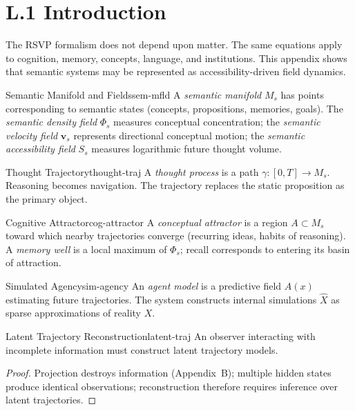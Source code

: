
\section*{L.1 Introduction}

The RSVP formalism does not depend upon matter. The same equations apply
to cognition, memory, concepts, language, and institutions. This appendix
shows that semantic systems may be represented as accessibility-driven
field dynamics.

\begin{definition}{Semantic Manifold and Fields}{sem-mfld}
  A \emph{semantic manifold} $M_s$ has points corresponding to semantic
  states (concepts, propositions, memories, goals). The \emph{semantic
  density field} $\Phi_s$ measures conceptual concentration; the
  \emph{semantic velocity field} $\mathbf{v}_s$ represents directional
  conceptual motion; the \emph{semantic accessibility field} $S_s$
  measures logarithmic future thought volume.
\end{definition}

\begin{definition}{Thought Trajectory}{thought-traj}
  A \emph{thought process} is a path $\gamma : [0,T] \to M_s$.
  Reasoning becomes navigation. The trajectory replaces the static
  proposition as the primary object.
\end{definition}

\begin{definition}{Cognitive Attractor}{cog-attractor}
  A \emph{conceptual attractor} is a region $A \subset M_s$ toward which
  nearby trajectories converge (recurring ideas, habits of reasoning).
  A \emph{memory well} is a local maximum of $\Phi_s$; recall corresponds
  to entering its basin of attraction.
\end{definition}

\begin{definition}{Simulated Agency}{sim-agency}
  An \emph{agent model} is a predictive field $A(x)$ estimating future
  trajectories. The system constructs internal simulations $\hat{X}$ as
  sparse approximations of reality $X$.
\end{definition}

\begin{theorem}{Latent Trajectory Reconstruction}{latent-traj}
  An observer interacting with incomplete information must construct
  latent trajectory models.
\end{theorem}
\begin{proof}
  Projection destroys information (Appendix~B); multiple hidden states
  produce identical observations; reconstruction therefore requires
  inference over latent trajectories.
\end{proof}

